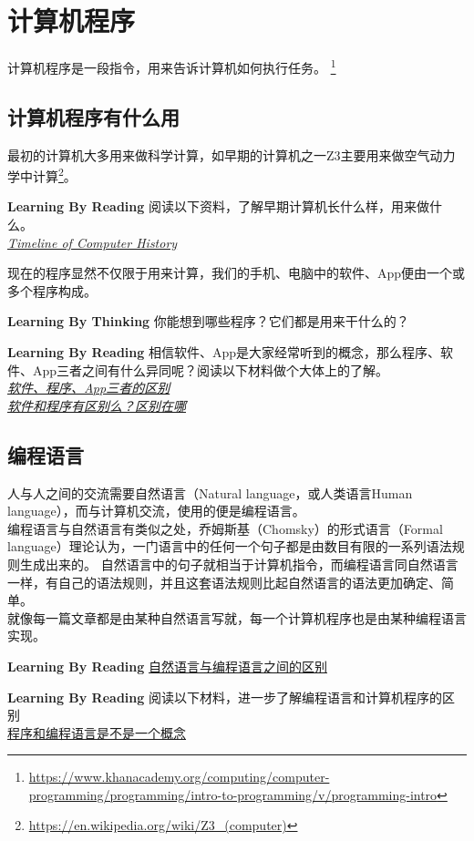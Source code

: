 \chapter{计算机程序}
计算机程序是一段指令，用来告诉计算机如何执行任务。
\footnote{\url{https://www.khanacademy.org/computing/computer-programming/programming/intro-to-programming/v/programming-intro}}
\section{计算机程序有什么用}
最初的计算机大多用来做科学计算，如早期的计算机之一Z3主要用来做空气动力学中计算\footnote{\url{https://en.wikipedia.org/wiki/Z3_(computer)}}。

\begin{paperbox}{\textbf{Learning By Reading}\startwo}
阅读以下资料，了解早期计算机长什么样，用来做什么。\\
\href{http://www.computerhistory.org/timeline/computers/}{\textit{Timeline of Computer History}}
\end{paperbox}
现在的程序显然不仅限于用来计算，我们的手机、电脑中的软件、App便由一个或多个程序构成。
\begin{paperbox}{\textbf{Learning By Thinking}\starfour}
你能想到哪些程序？它们都是用来干什么的？
\end{paperbox}
\begin{paperbox}{\textbf{Learning By Reading}\startwo}
相信软件、App是大家经常听到的概念，那么程序、软件、App三者之间有什么异同呢？阅读以下材料做个大体上的了解。\\
\href{https://teamtreehouse.com/community/the-difference-between-application-program-software}{\textit{软件、程序、App三者的区别}}\\
\href{https://www.guokr.com/question/544735/}{\textit{软件和程序有区别么？区别在哪}}
\end{paperbox}
\section{编程语言}
人与人之间的交流需要自然语言（Natural language，或人类语言Human language），而与计算机交流，使用的便是编程语言。\\
编程语言与自然语言有类似之处，乔姆斯基（Chomsky）的形式语言（Formal language）理论认为，一门语言中的任何一个句子都是由数目有限的一系列语法规则生成出来的。
自然语言中的句子就相当于计算机指令，而编程语言同自然语言一样，有自己的语法规则，并且这套语法规则比起自然语言的语法更加确定、简单。\\
就像每一篇文章都是由某种自然语言写就，每一个计算机程序也是由某种编程语言实现。
\begin{paperbox}{\textbf{Learning By Reading}\startwo}
\href{https://www.quora.com/Whats-the-difference-between-natural-languages-and-programming-languages}{自然语言与编程语言之间的区别}
\end{paperbox}
\begin{paperbox}{\textbf{Learning By Reading}\starone}
阅读以下材料，进一步了解编程语言和计算机程序的区别\\
\href{https://zhidao.baidu.com/question/96230010.html}{程序和编程语言是不是一个概念}
\end{paperbox}
